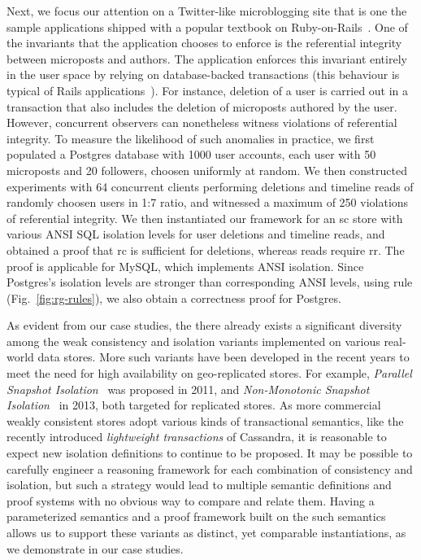 Next, we focus our attention on a Twitter-like microblogging site that
is one the sample applications shipped with a popular textbook on
Ruby-on-Rails~\cite{railsbook}. One of the invariants that the
application chooses to enforce is the referential integrity between
microposts and authors. The application enforces this invariant
entirely in the user space by relying on database-backed transactions
(this behaviour is typical of Rails applications~\cite{bailisferal}).
For instance, deletion of a user is carried out in a transaction that
also includes the deletion of microposts authored by the user.
However, concurrent observers can nonetheless witness violations of
referential integrity. To measure the likelihood of such anomalies in
practice, we first populated a Postgres database with 1000 user
accounts, each user with 50 microposts and 20 followers, choosen
uniformly at random. We then constructed experiments with 64
concurrent clients performing deletions and timeline reads of randomly
choosen users in 1:7 ratio, and witnessed a maximum of 250 violations
of referential integrity. We then instantiated our framework for an
{\sc sc} store with various ANSI SQL isolation levels for user
deletions and timeline reads, and obtained a proof that {\sc rc} is
sufficient for deletions, whereas reads require {\sc rr}. The proof is
applicable for MySQL, which implements ANSI isolation.  Since
Postgres's isolation levels are stronger than corresponding ANSI
levels, using  rule (Fig.~\ref{fig:rg-rules}), we
also obtain a correctness proof for Postgres. 

As evident from our case studies, the there already exists a
significant diversity among the weak consistency and isolation
variants implemented on various real-world data stores. More such
variants have been developed in the recent years to meet the need for
high availability on geo-replicated stores. For example,
\emph{Parallel Snapshot Isolation}~\cite{psi} was proposed in 2011,
and \emph{Non-Monotonic Snapshot Isolation}~\cite{nmsi} in 2013, both
targeted for replicated stores. As more commercial weakly consistent
stores adopt various kinds of transactional semantics, like the
recently introduced \emph{lightweight transactions} of Cassandra, it
is reasonable to expect new isolation definitions to continue to be
proposed. It may be possible to carefully engineer a reasoning
framework for each combination of consistency and isolation, but such
a strategy would lead to multiple semantic definitions and proof
systems with no obvious way to compare and relate them. Having a
parameterized semantics and a proof framework built on the such
semantics allows us to support these variants as distinct, yet
comparable instantiations, as we demonstrate in our case studies.





